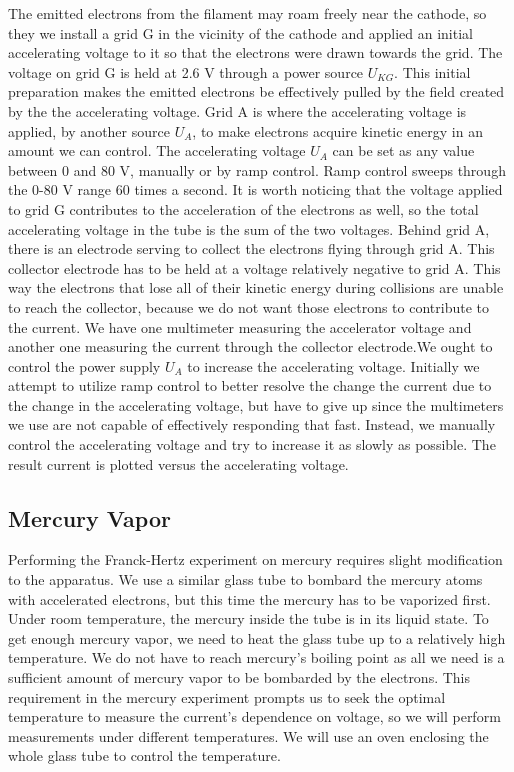 \documentclass[prb,preprint]{revtex4-1}
\begin{document}
The emitted electrons from the filament may roam freely near the cathode, so they we install a grid G in the vicinity of the cathode and applied an initial accelerating voltage to it so that the electrons were drawn towards the grid. The voltage on grid G is held at 2.6 V through a power source $U_{KG}$. This initial preparation makes the emitted electrons be effectively pulled by the field created by the the accelerating voltage. Grid A is where the accelerating voltage is applied, by another source $U_{A}$, to make electrons acquire kinetic energy in an amount we can control. The accelerating voltage $U_{A}$ can be set as any value between 0 and 80 V, manually or by ramp control. Ramp control sweeps through the 0-80 V range 60 times a second. It is worth noticing that the voltage applied to grid G contributes to the acceleration of the electrons as well, so the total accelerating voltage in the tube is the sum of the two voltages. Behind grid A, there is an electrode serving to collect the electrons flying through grid A. This collector electrode has to be held at a voltage relatively negative to grid A. This way the electrons that lose all of their kinetic energy during collisions are unable to reach the collector, because we do not want those electrons to contribute to the current. We have one multimeter measuring the accelerator voltage and another one measuring the current through the collector electrode.We ought to control the power supply $U_{A}$ to increase the accelerating voltage. Initially we attempt to utilize ramp control to better resolve the change the current due to the change in the accelerating voltage, but have to give up since the multimeters we use are not capable of effectively responding that fast. Instead, we manually control the accelerating voltage and try to increase it as slowly as possible. The result current is plotted versus the accelerating voltage.

\subsection{Mercury Vapor}

Performing the Franck-Hertz experiment on mercury requires slight modification to the apparatus. We use a similar glass tube to bombard the mercury atoms with accelerated electrons, but this time the mercury has to be vaporized first. Under room temperature, the mercury inside the tube is in its liquid state. To get enough mercury vapor, we need to heat the glass tube up to a relatively high temperature. We do not have to reach mercury's boiling point as all we need is a sufficient amount of mercury vapor to be bombarded by the electrons. This requirement in the mercury experiment prompts us to seek the optimal temperature to measure the current's dependence on voltage, so we will perform measurements under different temperatures. We will use an oven enclosing the whole glass tube to control the temperature.
\end{document}

